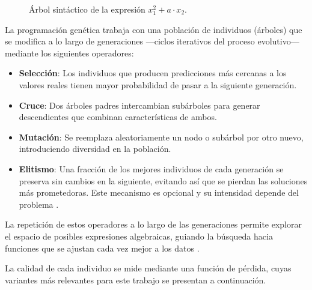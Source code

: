 \documentclass{article}
\begin{document}
\begin{figure}[ht]
    \centering
    \caption{Árbol sintáctico de la expresión $x_1^2 + a \cdot x_2$.}
    \label{fig:arbol_sintactico}
\end{figure}

La programación genética trabaja con una población de individuos
(árboles) que se modifica a lo largo de generaciones —ciclos iterativos
del proceso evolutivo— mediante los siguientes operadores:

\begin{itemize}
    \item \textbf{Selección}: Los individuos que producen predicciones
          más cercanas a los valores reales tienen mayor probabilidad de
          pasar a la siguiente generación.

    \item \textbf{Cruce}: Dos árboles padres intercambian subárboles
          para generar descendientes que combinan características de
          ambos.

    \item \textbf{Mutación}: Se reemplaza aleatoriamente un nodo o
          subárbol por otro nuevo, introduciendo diversidad en la
          población.

    \item \textbf{Elitismo}: Una fracción de los mejores individuos de
          cada generación se preserva sin cambios en la siguiente,
          evitando así que se pierdan las soluciones más prometedoras.
          Este mecanismo es opcional y su intensidad depende del
          problema \cite{koza1992genetic}.
\end{itemize}

La repetición de estos operadores a lo largo de las generaciones permite explorar el espacio de posibles expresiones algebraicas, guiando la búsqueda hacia funciones que se ajustan cada vez mejor a los datos \cite{koza1992genetic}.

La calidad de cada individuo se mide mediante una función de pérdida, cuyas variantes más relevantes para este trabajo se presentan a continuación.
\end{document}
